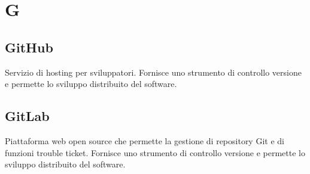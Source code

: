 \section*{G}
\markright{}
\subsection*{GitHub}
Servizio di hosting per sviluppatori. Fornisce uno strumento di controllo versione e permette lo sviluppo distribuito del software.
\subsection*{GitLab}
Piattaforma web open source che permette la gestione di repository Git e di funzioni trouble ticket. Fornisce uno strumento di controllo versione e permette lo sviluppo distribuito del software.